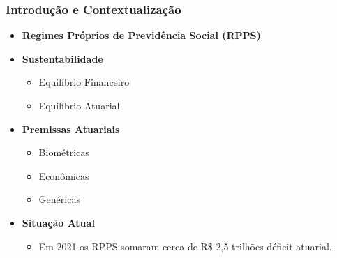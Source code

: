\documentclass[11pt]{beamer}
\begin{document}
    \begin{frame}

        \frametitle{Introdução e Contextualização}

        \begin{itemize}
            
            \item \textbf{Regimes Próprios de Previdência Social (RPPS)}

        \medskip

        \item \textbf{Sustentabilidade}

            \begin{itemize}
            
                \item[-] Equilíbrio Financeiro
                \medskip
                \item[-] Equilíbrio Atuarial
                
            \end{itemize}

        \medskip
        
        \item \textbf{Premissas Atuariais}

            \begin{itemize}
            
                \item[-] Biométricas
                \medskip
                \item[-] Econômicas
                \medskip
                \item[-] Genéricas
                
            \end{itemize}
            
        \medskip
        
        \item \textbf{Situação Atual}

            \begin{itemize}
                \item[-] Em 2021 os RPPS somaram cerca de R\$ 2,5 trilhões déficit atuarial.
            \end{itemize}
    
        \end{itemize}
        
    \end{frame}
    
\end{document}
